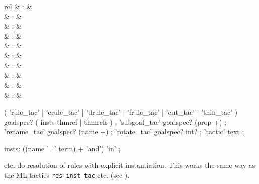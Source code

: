 \begin{isabellebody}
\begin{isamarkuptext}
  \begin{matharray}{rcl}
    \mbox{}\isa{\isactrlsup {\isacharasterisk}} & : & \isarmeth \\
    \mbox{}\isa{\isactrlsup {\isacharasterisk}} & : & \isarmeth \\
    \mbox{}\isa{\isactrlsup {\isacharasterisk}} & : & \isarmeth \\
    \mbox{}\isa{\isactrlsup {\isacharasterisk}} & : & \isarmeth \\
    \mbox{}\isa{\isactrlsup {\isacharasterisk}} & : & \isarmeth \\
    \mbox{}\isa{\isactrlsup {\isacharasterisk}} & : & \isarmeth \\
    \mbox{}\isa{\isactrlsup {\isacharasterisk}} & : & \isarmeth \\
    \mbox{}\isa{\isactrlsup {\isacharasterisk}} & : & \isarmeth \\
    \mbox{}\isa{\isactrlsup {\isacharasterisk}} & : & \isarmeth \\
    \mbox{}\isa{\isactrlsup {\isacharasterisk}} & : & \isarmeth \\
  \end{matharray}

  \begin{rail}
    ( 'rule\_tac' | 'erule\_tac' | 'drule\_tac' | 'frule\_tac' | 'cut\_tac' | 'thin\_tac' ) goalspec?
    ( insts thmref | thmrefs )
    ;
    'subgoal\_tac' goalspec? (prop +)
    ;
    'rename\_tac' goalspec? (name +)
    ;
    'rotate\_tac' goalspec? int?
    ;
    'tactic' text
    ;

    insts: ((name '=' term) + 'and') 'in'
    ;
  \end{rail}

\begin{descr}

  \item [\mbox{\isa{rule{\isacharunderscore}tac}} etc.] do resolution of rules with explicit
  instantiation.  This works the same way as the ML tactics \verb|res_inst_tac| etc. (see \cite[\S3]{isabelle-ref}).


\end{descr}
\end{isamarkuptext}
\end{isabellebody}
